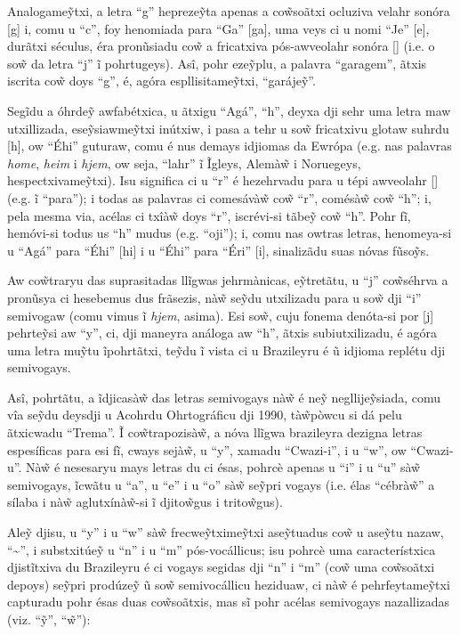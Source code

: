 \documentclass[12pt, a5paper, titlepage]{article}
\begin{document}
\begin{bilingualpages}
    Analogame\~ytxi, a letra ``g'' hepreze\~yta apenas a co\~wsoãtxi ocluziva velahr sonóra [g] i, comu u ``c'', foy henomiada para ``Ga'' [ga], uma veys ci u nomi ``Je'' [\textyogh e], durãtxi séculus, éra pronũsiadu co\~w a fricatxiva pós-awveolahr sonóra [\textyogh] (i.e. o so\~w da letra ``j'' ĩ pohrtugeys). Asî, pohr eze\~yplu, a palavra ``garagem'', ãtxis iscrita co\~w doys ``g'', é, agóra espllisitame\~ytxi, ``garáje\~y''.

    Segĩdu a óhrde\~y awfabétxica, u ãtxigu ``Agá'', ``h'', deyxa dji sehr uma letra maw utxillizada, ese\~ysiawme\~ytxi inútxiw, i pasa a tehr u so\~w fricatxivu glotaw suhrdu [h], ow ``Éhi'' guturaw, comu é nus demays idjiomas da Ewrópa (e.g. nas palavras \textit{home}, \textit{heim} i \textit{hjem}, ow seja, ``lahr'' ĩ Ĩgleys, Alemà\~w i Noruegeys, hespectxivame\~ytxi). Isu significa ci u ``r'' é hezehrvadu para u tépi awveolahr [\textfishhookr] (e.g. ĩ ``para''); i todas as palavras ci comesávà\~w co\~w ``r'', comésà\~w co\~w ``h''; i, pela mesma via, acélas ci txîà\~w doys ``r'', iscrévi-si tãbe\~y co\~w ``h''. Pohr fĩ, hemóvi-si todus us ``h'' mudus (e.g. ``oji''); i, comu nas owtras letras, henomeya-si u ``Agá'' para ``Éhi'' [\textepsilon hi] i u ``Éhi'' para ``Éri'' [\textepsilon \textfishhookr i], sinalizãdu suas nóvas fũso\~ys.

    Aw co\~wtraryu das suprasitadas llĩgwas jehrmànicas, e\~ytretãtu, u ``j'' co\~wséhrva a pronũsya ci hesebemus dus frãsezis, nà\~w se\~ydu utxilizadu para u so\~w dji ``i'' semivogaw (comu vimus ĩ \textit{hjem}, asima). Esi so\~w, cuju fonema denóta-si por [j] pehrte\~ysi aw ``y'', ci, dji maneyra análoga aw ``h'', ãtxis subiutxilizadu, é agóra uma letra mu\~ytu ĩpohrtãtxi, te\~ydu ĩ vista ci u Brazileyru é ũ idjioma replétu dji semivogays. 

    Asî, pohrtãtu, a ĩdjicasà\~w das letras semivogays nà\~w é ne\~y negllije\~ysiada, comu vîa se\~ydu deysdji u Acohrdu Ohrtográficu dji 1990, tà\~wpòwcu si dá pelu ãtxicwadu ``Trema''. Ĩ co\~wtrapozisà\~w, a nóva llĩgwa brazileyra dezigna letras espesíficas para esi fĩ, cways sejà\~w, u ``y'', xamadu ``Cwazi-i'', i u ``w'', ow ``Cwazi-u''. Nà\~w é nesesaryu mays letras du ci ésas, pohrcè apenas u ``i'' i u ``u'' sà\~w semivogays, ĩcwãtu u ``a'', u ``e'' i u ``o'' sà\~w se\~ypri vogays (i.e. élas ``cébrà\~w'' a sílaba i nà\~w aglutxínà\~w-si ĩ djito\~wgus i trito\~wgus).

    Ale\~y djisu, u ``y'' i u ``w'' sà\~w frecwe\~ytxime\~ytxi ase\~ytuadus co\~w u ase\~ytu nazaw, ``\textasciitilde'', i substxitúe\~y u ``n'' i u ``m'' pós-vocállicus; isu pohrcè uma característxica djistĩtxiva du Brazileyru é ci vogays segidas dji ``n'' i ``m'' (co\~w uma co\~wsoãtxi depoys) se\~ypri prodúze\~y ũ so\~w semivocállicu heziduaw, ci nà\~w é pehrfeytame\~ytxi capturadu pohr ésas duas co\~wsoãtxis, mas sĩ pohr acélas semivogays nazallizadas (viz. ``\~y'', ``\~w''):


\end{bilingualpages}
\end{document}
